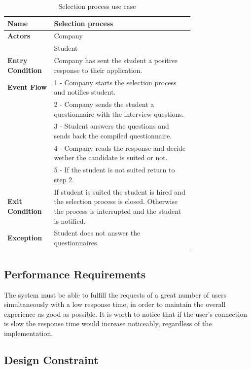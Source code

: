 \documentclass[12pt]{article}
\numberwithin{figure}{section}
\numberwithin{table}{section}
\begin{document}
        \begin{center}
            \begin{longtable}{|l|p{0.75\linewidth}|}
                \hline
                \textbf{Name} & Selection process \\
                \hline
                \textbf{Actors} 
                & Company \\
                & Student \\
                \hline
                \textbf{Entry Condition}
                & Company has sent the student a positive response to their application. \\
                \hline
                \textbf{Event Flow}
                & 1 - Company starts the selection process and notifies student. \\
                & 2 - Company sends the student a questionnaire with the interview questions. \\
                & 3 - Student answers the questions and sends back the compiled questionnaire. \\
                & 4 - Company reads the response and decide wether the candidate is suited or not. \\
                & 5 - If the student is not suited return to step 2. \\
                \hline
                \textbf{Exit Condition}
                & If student is suited the student is hired and the selection process is closed. Otherwise the process is interrupted and the student is notified. \\
                \hline
                \textbf{Exception}
                & Student does not answer the questionnaires. \\
                \hline
                \caption{Selection process use case}
            \end{longtable}
        \end{center}

\newpage
\subsection{Performance Requirements}
    The system must be able to fulfill the requests of a great number of users simultaneously with a low response time, in order to maintain the overall experience as good as possible.
    It is worth to notice that if the user's connection is slow the response time would increase noticeably, regardless of the implementation. 
\subsection{Design Constraint}
\end{document}
